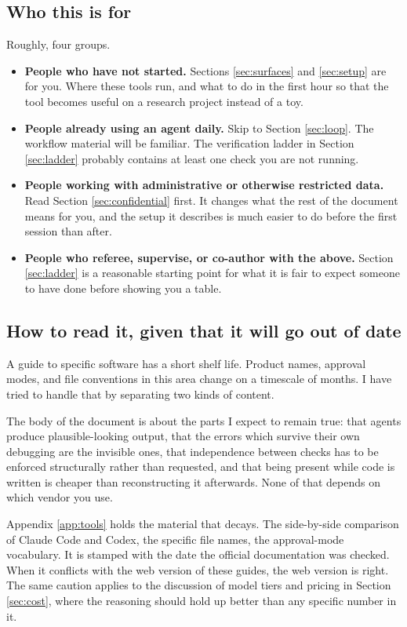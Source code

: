 \documentclass[11pt,a4paper]{article}
\begin{document}
\subsection{Who this is for}

Roughly, four groups.

\begin{itemize}
\item \textbf{People who have not started.} Sections \ref{sec:surfaces} and
  \ref{sec:setup} are for you. Where these tools run, and what to do in the
  first hour so that the tool becomes useful on a research project instead of a
  toy.
\item \textbf{People already using an agent daily.} Skip to
  Section \ref{sec:loop}. The workflow material will be familiar. The
  verification ladder in Section \ref{sec:ladder} probably contains at least one
  check you are not running.
\item \textbf{People working with administrative or otherwise restricted data.}
  Read Section \ref{sec:confidential} first. It changes what the rest of the
  document means for you, and the setup it describes is much easier to do before
  the first session than after.
\item \textbf{People who referee, supervise, or co-author with the above.} Section
  \ref{sec:ladder} is a reasonable starting point for what it is fair to expect
  someone to have done before showing you a table.
\end{itemize}

\subsection{How to read it, given that it will go out of date}

A guide to specific software has a short shelf life. Product names, approval
modes, and file conventions in this area change on a timescale of months. I have
tried to handle that by separating two kinds of content.

The body of the document is about the parts I expect to remain true: that agents
produce plausible-looking output, that the errors which survive their own
debugging are the invisible ones, that independence between checks has to be
enforced structurally rather than requested, and that being present while code
is written is cheaper than reconstructing it afterwards. None of that depends on
which vendor you use.

Appendix \ref{app:tools} holds the material that decays. The side-by-side
comparison of Claude Code and Codex, the specific file names, the approval-mode
vocabulary. It is stamped with the date the official documentation was checked.
When it conflicts with the web version of these guides, the web version is
right. The same caution applies to the discussion of model tiers and pricing in
Section \ref{sec:cost}, where the reasoning should hold up better than any
specific number in it.
\end{document}
